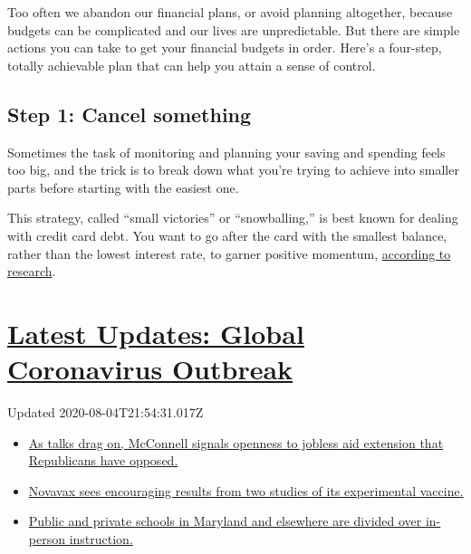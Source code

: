 Too often we abandon our financial plans, or avoid planning altogether,
because budgets can be complicated and our lives are unpredictable. But
there are simple actions you can take to get your financial budgets in
order. Here's a four-step, totally achievable plan that can help you
attain a sense of control.

\hypertarget{step-1-cancel-something}{%
\subsection{Step 1: Cancel something}\label{step-1-cancel-something}}

Sometimes the task of monitoring and planning your saving and spending
feels too big, and the trick is to break down what you're trying to
achieve into smaller parts before starting with the easiest one.

This strategy, called ``small victories'' or ``snowballing,'' is best
known for dealing with credit card debt. You want to go after the card
with the smallest balance, rather than the lowest interest rate, to
garner positive momentum,
\href{https://www.nber.org/papers/w20125.pdf}{according to research}.

\hypertarget{latest-updates-global-coronavirus-outbreak}{%
\section{\texorpdfstring{\href{https://www.nytimes3xbfgragh.onion/2020/08/04/world/coronavirus-cases.html?action=click\&pgtype=Article\&state=default\&region=MAIN_CONTENT_1\&context=storylines_live_updates}{Latest
Updates: Global Coronavirus
Outbreak}}{Latest Updates: Global Coronavirus Outbreak}}\label{latest-updates-global-coronavirus-outbreak}}

Updated 2020-08-04T21:54:31.017Z

\begin{itemize}
\tightlist
\item
  \href{https://www.nytimes3xbfgragh.onion/2020/08/04/world/coronavirus-cases.html?action=click\&pgtype=Article\&state=default\&region=MAIN_CONTENT_1\&context=storylines_live_updates\#link-2daa96b5}{As
  talks drag on, McConnell signals openness to jobless aid extension
  that Republicans have opposed.}
\item
  \href{https://www.nytimes3xbfgragh.onion/2020/08/04/world/coronavirus-cases.html?action=click\&pgtype=Article\&state=default\&region=MAIN_CONTENT_1\&context=storylines_live_updates\#link-1228a480}{Novavax
  sees encouraging results from two studies of its experimental
  vaccine.}
\item
  \href{https://www.nytimes3xbfgragh.onion/2020/08/04/world/coronavirus-cases.html?action=click\&pgtype=Article\&state=default\&region=MAIN_CONTENT_1\&context=storylines_live_updates\#link-4825b93}{Public
  and private schools in Maryland and elsewhere are divided over
  in-person instruction.}
\end{itemize}

